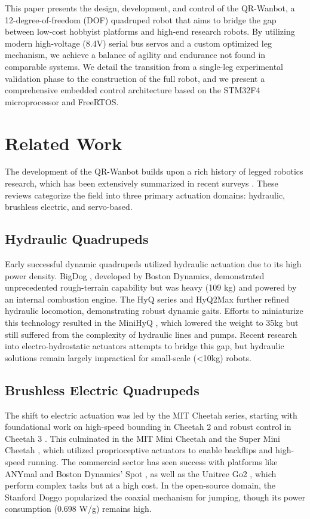 \documentclass[pdflatex,sn-mathphys-num]{sn-jnl}%
\theoremstyle{thmstyleone}%
\theoremstyle{thmstyletwo}%
\theoremstyle{thmstylethree}%
\begin{document}
This paper presents the design, development, and control of the QR-Wanbot, a 12-degree-of-freedom (DOF) quadruped robot that aims to bridge the gap between low-cost hobbyist platforms and high-end research robots. By utilizing modern high-voltage (8.4V) serial bus servos and a custom optimized leg mechanism, we achieve a balance of agility and endurance not found in comparable systems. We detail the transition from a single-leg experimental validation phase to the construction of the full robot, and we present a comprehensive embedded control architecture based on the STM32F4 microprocessor and FreeRTOS.

\section{Related Work}\label{sec:related}

The development of the QR-Wanbot builds upon a rich history of legged robotics research, which has been extensively summarized in recent surveys \cite{Fan2024, Chai2022}. These reviews categorize the field into three primary actuation domains: hydraulic, brushless electric, and servo-based.

\subsection{Hydraulic Quadrupeds}
Early successful dynamic quadrupeds utilized hydraulic actuation due to its high power density. BigDog \cite{Raibert2008}, developed by Boston Dynamics, demonstrated unprecedented rough-terrain capability but was heavy (109 kg) and powered by an internal combustion engine. The HyQ series \cite{Semini2011, Semini2017} and HyQ2Max \cite{Semini2015} further refined hydraulic locomotion, demonstrating robust dynamic gaits. Efforts to miniaturize this technology resulted in the MiniHyQ \cite{Khan2015}, which lowered the weight to 35kg but still suffered from the complexity of hydraulic lines and pumps. Recent research into electro-hydrostatic actuators \cite{Nakanishi2021} attempts to bridge this gap, but hydraulic solutions remain largely impractical for small-scale (<10kg) robots.

\subsection{Brushless Electric Quadrupeds}
The shift to electric actuation was led by the MIT Cheetah series, starting with foundational work on high-speed bounding in Cheetah 2 \cite{Park2017} and robust control in Cheetah 3 \cite{Bledt2018}. This culminated in the MIT Mini Cheetah \cite{Katz2019} and the Super Mini Cheetah \cite{Bosworth2015}, which utilized proprioceptive actuators to enable backflips and high-speed running. The commercial sector has seen success with platforms like ANYmal \cite{Hutter2016} and Boston Dynamics' Spot \cite{Bouman2020}, as well as the Unitree Go2 \cite{UnitreeGo2}, which perform complex tasks but at a high cost. In the open-source domain, the Stanford Doggo \cite{Kau2019} popularized the coaxial mechanism for jumping, though its power consumption (0.698 W/g) remains high.
\end{document}
